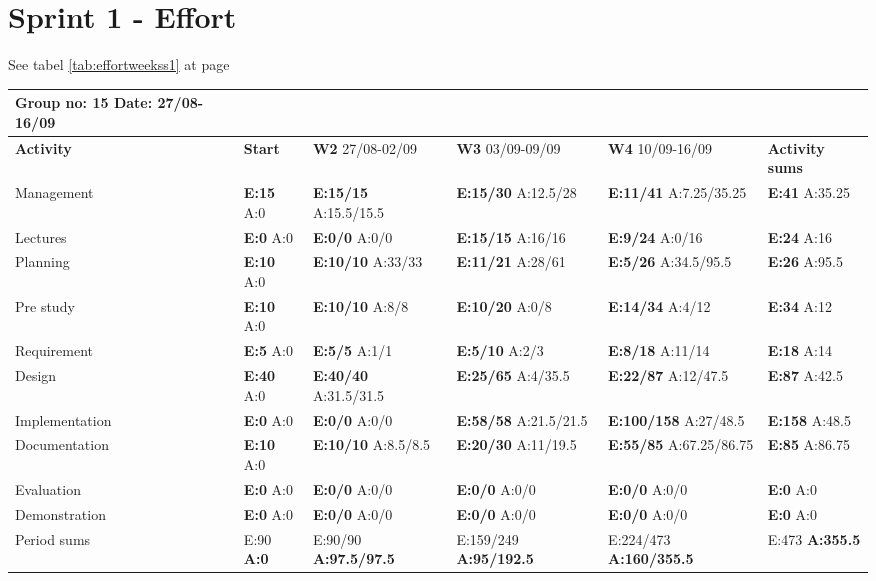 \section{Sprint 1 - Effort}

See tabel \ref{tab:effortweekss1} at page \pageref{tab:effortweekss1}
\begin{table}
\begin{tabularx}{\linewidth}{>{\setlength\hsize{.625\hsize}}X|>{\setlength\hsize{0.3\hsize}}X|>{\setlength\hsize{0.5\hsize}}X|>{\setlength\hsize{0.5\hsize}}X|>{\setlength\hsize{0.5\hsize}}X|>{\setlength\hsize{.3\hsize}}X}
Group no: 15 Date: 27/08-16/09  \\ \hline
\textbf{Activity} & \textbf{Start} & \textbf{W2} 27/08-02/09 & \textbf{W3} 03/09-09/09 & \textbf{W4} 10/09-16/09 & \textbf{Activity sums} \\ \hline \hline
Management & \textbf{E:15} A:0 & \textbf{E:15/15} A:15.5/15.5 & \textbf{E:15/30} A:12.5/28 & \textbf{E:11/41} A:7.25/35.25 & \textbf{E:41} A:35.25  \\ \hline
Lectures & \textbf{E:0} A:0 & \textbf{E:0/0} A:0/0 & \textbf{E:15/15} A:16/16 & \textbf{E:9/24} A:0/16 & \textbf{E:24 } A:16  \\ \hline
Planning & \textbf{E:10} A:0 & \textbf{E:10/10} A:33/33 & \textbf{E:11/21} A:28/61 & \textbf{E:5/26} A:34.5/95.5 & \textbf{E:26 } A:95.5  \\ \hline
Pre study & \textbf{E:10} A:0 & \textbf{E:10/10} A:8/8 & \textbf{E:10/20} A:0/8 & \textbf{E:14/34} A:4/12 & \textbf{E:34 } A:12  \\ \hline
Requirement & \textbf{E:5} A:0 & \textbf{E:5/5} A:1/1 & \textbf{E:5/10} A:2/3 & \textbf{E:8/18} A:11/14 & \textbf{E:18 } A:14  \\ \hline
Design & \textbf{E:40} A:0 & \textbf{E:40/40} A:31.5/31.5 & \textbf{E:25/65} A:4/35.5 & \textbf{E:22/87} A:12/47.5 & \textbf{E:87 } A:42.5  \\ \hline
Implementation & \textbf{E:0} A:0 & \textbf{E:0/0} A:0/0 & \textbf{E:58/58} A:21.5/21.5 & \textbf{E:100/158} A:27/48.5 & \textbf{E:158 } A:48.5  \\ \hline
Documentation & \textbf{E:10} A:0 & \textbf{E:10/10} A:8.5/8.5 & \textbf{E:20/30} A:11/19.5 & \textbf{E:55/85} A:67.25/86.75 & \textbf{E:85 } A:86.75  \\ \hline
Evaluation & \textbf{E:0} A:0 & \textbf{E:0/0} A:0/0 & \textbf{E:0/0} A:0/0 & \textbf{E:0/0} A:0/0 & \textbf{E:0 } A:0  \\ \hline
Demonstration & \textbf{E:0} A:0 & \textbf{E:0/0} A:0/0 & \textbf{E:0/0} A:0/0 & \textbf{E:0/0} A:0/0 & \textbf{E:0 } A:0  \\ \hline
Period sums & E:90 \textbf{A:0} & E:90/90 \textbf{A:97.5/97.5} & E:159/249 \textbf{A:95/192.5} & E:224/473 \textbf{A:160/355.5} & E:473 \textbf{A:355.5}
\end{tabularx}


\end{table}
